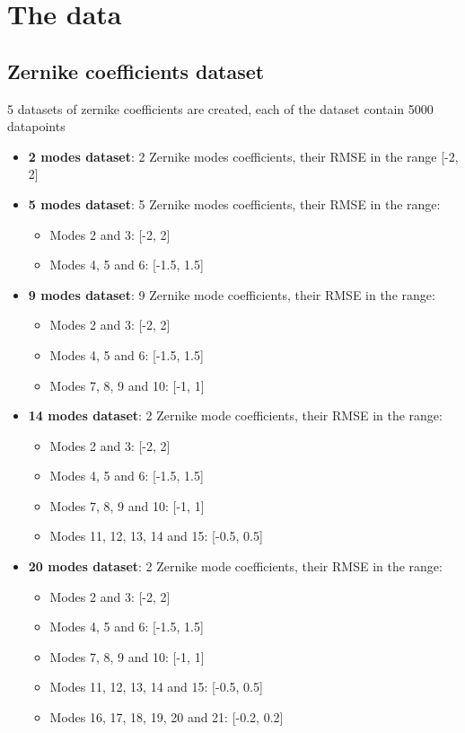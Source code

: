 \section{The data}
	
	\subsection{Zernike coefficients dataset}
			5 datasets of zernike coefficients are created, each of the dataset contain 5000 datapoints
			\begin{itemize}
				\item \textbf{2 modes dataset}: 2 Zernike modes coefficients, their RMSE in the range [-2, 2]
				\item \textbf{5 modes dataset}: 5 Zernike modes coefficients, their RMSE in the range:
					\begin{itemize}
						\item Modes 2 and 3: [-2, 2]
						\item Modes 4, 5 and 6: [-1.5, 1.5]
					\end{itemize}					 
				\item \textbf{9 modes dataset}: 9 Zernike mode coefficients, their RMSE in the range:
					\begin{itemize}
						\item Modes 2 and 3: [-2, 2]
						\item Modes 4, 5 and 6: [-1.5, 1.5]
						\item Modes 7, 8, 9 and 10: [-1, 1]
					\end{itemize}					 
				\item \textbf{14 modes dataset}: 2 Zernike mode coefficients, their RMSE in the range:
					\begin{itemize}
						\item Modes 2 and 3: [-2, 2]
						\item Modes 4, 5 and 6: [-1.5, 1.5]
						\item Modes 7, 8, 9 and 10: [-1, 1]
						\item Modes 11, 12, 13, 14 and 15: [-0.5, 0.5]
					\end{itemize}					 
				\item \textbf{20 modes dataset}: 2 Zernike mode coefficients, their RMSE in the range:
					\begin{itemize}
						\item Modes 2 and 3: [-2, 2]
						\item Modes 4, 5 and 6: [-1.5, 1.5]
						\item Modes 7, 8, 9 and 10: [-1, 1]
						\item Modes 11, 12, 13, 14 and 15: [-0.5, 0.5]
						\item Modes 16, 17, 18, 19, 20 and 21: [-0.2, 0.2]
					\end{itemize}					 
			\end{itemize}
			
